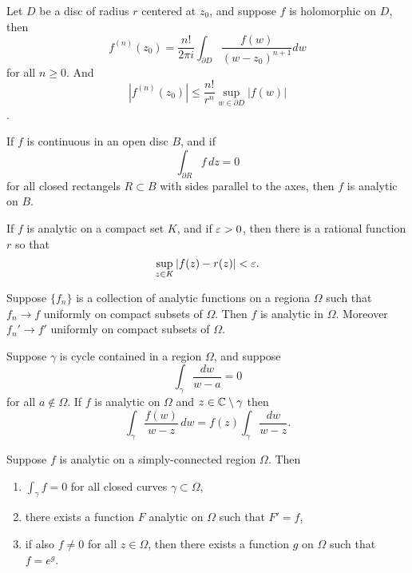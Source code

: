 \documentclass[12pt]{article}
\begin{document}
\begin{theorem}
    Let $D$ be a disc of radius $r$ centered at $z_0$, and suppose $f$ is holomorphic on $D$, then $$f^{(n)}(z_0)=\frac{n!}{2\pi i}\int_{\partial D} \frac{f(w)}{(w-z_0)^{n+1}}dw$$ for all $n\geq 0$. And $$|f^{(n)}(z_0)|\leq\frac{n!}{r^n}\sup_{w\in\partial D} |f(w)|$$.
\end{theorem}

\begin{theorem}[Morea]
    If $f$ is continuous in an open disc $B$, and if $$\int_{\partial R} f \, dz=0$$ for all closed rectangels $R\subset B$ with sides parallel to the axes, then $f$ is analytic on $B$. 
\end{theorem}

\begin{theorem}[Runge]
    If $f$ is analytic on a compact set $K$, and if $\varepsilon>0$, then there is a rational function $r$ so that 
    \begin{equation*}
        \sup_{z\in K}|f(z)-r(z)|<\varepsilon.
    \end{equation*}
\end{theorem}

\begin{theorem}[Weirstrass]
    Suppose $\{f_n\}$ is a collection of analytic functions on a regiona $\Omega$ such that $f_n\to f$ uniformly on compact subsets of $\Omega$. Then $f$ is analytic in $\Omega$. Moreover $f_n'\to f'$ uniformly on compact subsets of $\Omega$.
\end{theorem}

\begin{theorem}
    Suppose $\gamma$ is cycle contained in a region $\Omega$, and suppose $$\int_\gamma \frac{dw}{w-a}=0$$ for all $a\notin\Omega$. If $f$ is analytic on $\Omega$ and $z\in \mathbb{C}\setminus\gamma$ then $$\int_\gamma \frac{f(w)}{w-z}\,dw=f(z)\int_\gamma \frac{dw}{w-z}.$$
\end{theorem}

\begin{theorem}
    Suppose $f$ is analytic on a simply-connected region $\Omega$. Then 
    \begin{enumerate}[label=(\roman*)]
        \item $\int_\gamma f = 0$ for all closed curves $\gamma\subset\Omega$,
        \item there exists a function $F$ analytic on $\Omega$ such that $F'=f$,
        \item if also $f\neq 0$ for all $z\in\Omega$, then there exists a function $g$ on $\Omega$ such that $f=e^g$.
    \end{enumerate}
\end{theorem}
\end{document}
